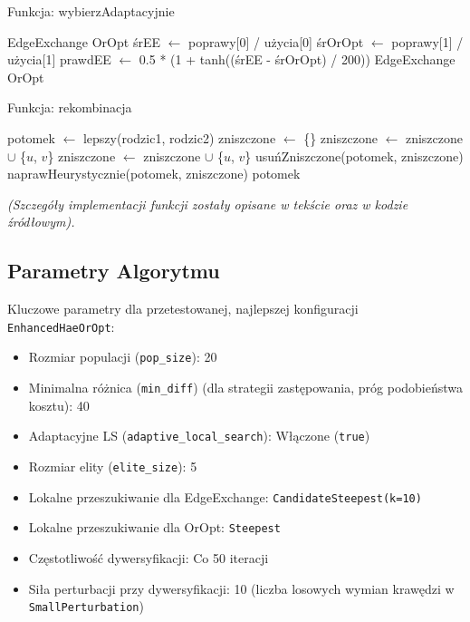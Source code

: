 \documentclass[12pt,a4paper]{article}
\begin{document}
\begin{algorithm}[H]
\caption{Funkcja: wybierzAdaptacyjnie}
\label{alg:select_adaptive}
\begin{algorithmic}[1]
     \Return EdgeExchange \EndIf
     \Return OrOpt \EndIf
    \State śrEE $\leftarrow$ poprawy[0] / użycia[0]
    \State śrOrOpt $\leftarrow$ poprawy[1] / użycia[1]
    \State prawdEE $\leftarrow$ 0.5 * (1 + tanh((śrEE - śrOrOpt) / 200))
     \Return EdgeExchange
    \Else \Return OrOpt
    \EndIf
\EndFunction
\end{algorithmic}
\end{algorithm}

\begin{algorithm}[H]
\caption{Funkcja: rekombinacja}
\label{alg:recombination}
\begin{algorithmic}[1]
    \State potomek $\leftarrow$ lepszy(rodzic1, rodzic2)
    \State zniszczone $\leftarrow$ \{\}
    \State
            \State zniszczone $\leftarrow$ zniszczone $\cup$ \{$u$, $v$\}
            \State zniszczone $\leftarrow$ zniszczone $\cup$ \{$u$, $v$\}
        \EndIf
    \EndFor
    \State
    \State usuńZniszczone(potomek, zniszczone)
    \State naprawHeurystycznie(potomek, zniszczone)
    \State \Return potomek
\EndFunction
\end{algorithmic}
\end{algorithm}

\textit{(Szczegóły implementacji funkcji zostały opisane w tekście oraz w kodzie źródłowym).}

\subsection{Parametry Algorytmu}
Kluczowe parametry dla przetestowanej, najlepszej konfiguracji \texttt{EnhancedHaeOrOpt}:
\begin{itemize}
    \item Rozmiar populacji (\texttt{pop\_size}): 20
    \item Minimalna różnica (\texttt{min\_diff}) (dla strategii zastępowania, próg podobieństwa kosztu): 40
    \item Adaptacyjne LS (\texttt{adaptive\_local\_search}): Włączone (\texttt{true})
    \item Rozmiar elity (\texttt{elite\_size}): 5
    \item Lokalne przeszukiwanie dla EdgeExchange: \texttt{CandidateSteepest(k=10)}
    \item Lokalne przeszukiwanie dla OrOpt: \texttt{Steepest}
    \item Częstotliwość dywersyfikacji: Co 50 iteracji
    \item Siła perturbacji przy dywersyfikacji: 10 (liczba losowych wymian krawędzi w \texttt{SmallPerturbation})
\end{itemize}
\end{document}
